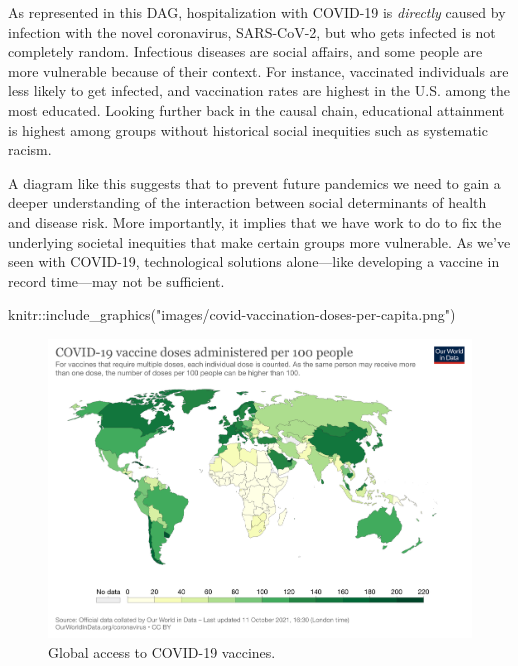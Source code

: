 \documentclass[
  letterpaper,
  DIV=11,
  numbers=noendperiod,
  oneside]{scrartcl}
\newenvironment{Shaded}{\begin{snugshade}}{\end{snugshade}}
\newcommand{\FunctionTok}[1]{\textcolor[rgb]{0.28,0.35,0.67}{#1}}
\newcommand{\NormalTok}[1]{\textcolor[rgb]{0.00,0.23,0.31}{#1}}
\newcommand{\SpecialCharTok}[1]{\textcolor[rgb]{0.37,0.37,0.37}{#1}}
\newcommand{\StringTok}[1]{\textcolor[rgb]{0.13,0.47,0.30}{#1}}
\begin{document}
As represented in this DAG, hospitalization with COVID-19 is
\emph{directly} caused by infection with the novel coronavirus,
SARS-CoV-2, but who gets infected is not completely random. Infectious
diseases are social affairs, and some people are more vulnerable because
of their context. For instance, vaccinated individuals are less likely
to get infected, and vaccination rates are highest in the U.S. among the
most educated. Looking further back in the causal chain, educational
attainment is highest among groups without historical social inequities
such as systematic racism.

A diagram like this suggests that to prevent future pandemics we need to
gain a deeper understanding of the interaction between social
determinants of health and disease risk. More importantly, it implies
that we have work to do to fix the underlying societal inequities that
make certain groups more vulnerable. As we've seen with COVID-19,
technological solutions alone---like developing a vaccine in record
time---may not be sufficient.

\begin{Shaded}
\begin{Highlighting}[]
\NormalTok{knitr}\SpecialCharTok{::}\FunctionTok{include\_graphics}\NormalTok{(}\StringTok{"images/covid{-}vaccination{-}doses{-}per{-}capita.png"}\NormalTok{) }
\end{Highlighting}
\end{Shaded}

\begin{figure}[H]

{\centering \includegraphics{images/covid-vaccination-doses-per-capita.png}

}

\caption{\label{fig-covidvaccines}Global access to COVID-19 vaccines.}

\end{figure}
\end{document}
